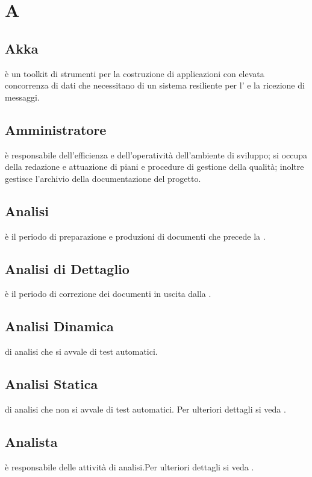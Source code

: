 \documentclass[12pt,a4paper]{article}
\begin{document}
\newpage
\tableofcontents
\newpage


\section{A}

\subsection{Akka} 
è un toolkit di strumenti per la costruzione di applicazioni con elevata concorrenza di dati che necessitano di un sistema resiliente per l' e la ricezione di messaggi.

\subsection{Amministratore} 
è responsabile dell'efficienza e dell'operatività dell'ambiente di sviluppo; si occupa della redazione e attuazione di piani e procedure di gestione della qualità; inoltre gestisce l'archivio della documentazione del progetto.

\subsection{Analisi}
è il periodo di preparazione e produzioni di documenti che precede la \RR.

\subsection{Analisi di Dettaglio}
è il periodo di correzione dei documenti in uscita dalla \RR.

\subsection{Analisi Dinamica}
  di analisi che si avvale di test automatici.

\subsection{Analisi Statica}
  di analisi che non si avvale di test automatici. Per ulteriori dettagli si veda \PdQ{}.

\subsection{Analista}
è responsabile delle attività di analisi.Per ulteriori dettagli si veda \PdQ{}.
\end{document}
